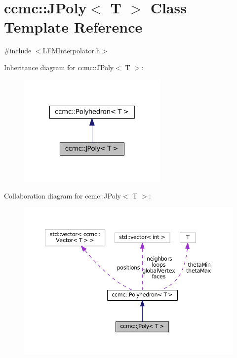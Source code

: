 \hypertarget{classccmc_1_1_j_poly}{\section{ccmc\-:\-:J\-Poly$<$ T $>$ Class Template Reference}
\label{classccmc_1_1_j_poly}
}


{\ttfamily \#include $<$L\-F\-M\-Interpolator.\-h$>$}



Inheritance diagram for ccmc\-:\-:J\-Poly$<$ T $>$\-:
\nopagebreak
\begin{figure}[H]
\begin{center}
\leavevmode
\includegraphics[width=208pt]{classccmc_1_1_j_poly__inherit__graph}
\end{center}
\end{figure}


Collaboration diagram for ccmc\-:\-:J\-Poly$<$ T $>$\-:
\nopagebreak
\begin{figure}[H]
\begin{center}
\leavevmode
\includegraphics[width=350pt]{classccmc_1_1_j_poly__coll__graph}
\end{center}
\end{figure}
